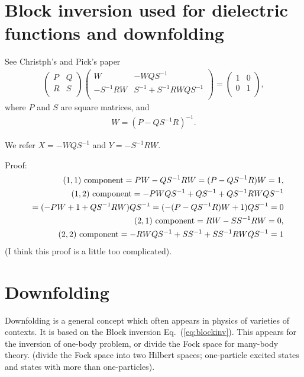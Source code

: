 \documentclass[a4paper,10pt,fleqn]{article}
\newcommand{\req}[1]{\mbox{Eq.~(\ref{#1})}}
\begin{document}
\section{Block inversion used for dielectric functions and downfolding}
See Christph's and Pick's paper
\begin{eqnarray}
\left(\begin{array}{cc} P & Q \\ R & S \\ \end{array} \right) 
\left(\begin{array}{cc} W & -WQS^{-1} \\ -S^{-1}RW & S^{-1}+S^{-1}RWQS^{-1} \\ \end{array} \right) 
=\left(\begin{array}{cc} 1 & 0 \\ 0 & 1 \\ \end{array} \right), 
\label{eq:blockinv}
\end{eqnarray}
where $P$ and $S$ are square matrices, and
\begin{eqnarray}
W=(P-QS^{-1}R)^{-1}. \label{eq:blockinvw}
\end{eqnarray}

We refer $X=-WQS^{-1}$ and $Y=-S^{-1}RW$.

Proof:
\begin{eqnarray}
&&{\rm (1,1) \ component}= PW-QS^{-1}RW=(P-QS^{-1}R)W = 1,\\
&&{\rm (1,2) \ component}= -PWQS^{-1}+QS^{-1}+QS^{-1}RWQS^{-1}\nonumber\\ 
&&=(-PW+1+QS^{-1}RW)QS^{-1}=(-(P-QS^{-1}R)W+1)QS^{-1}=0\\
&&{\rm (2,1) \ component}= RW-SS^{-1}RW=0,\\
&&{\rm (2,2) \ component}= -RWQS^{-1}+SS^{-1}+SS^{-1}RWQS^{-1}=1
\end{eqnarray}
(I think this proof is a little too complicated).

\section{Downfolding}
Downfolding is a general concept which often appears in physics of varieties of contexts. It is based on the Block inversion \req{eq:blockinv}.
This appears for the inversion of one-body problem, or divide the Fock space
for many-body theory.
(divide the Fock space into two Hilbert spaces; one-particle excited states and
states with more than one-particles). 
\end{document}
